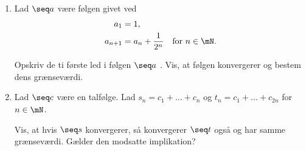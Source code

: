 \begin{opg}\hfill 
\begin{enumerate}
    \item Lad $\seq a$ være følgen givet ved
    \begin{align*}
    a_1 &= 1, \\
    a_{n+1} &= a_n+\frac{1}{2^n} \quad \text{for $n \in \mN$}. 
    \end{align*}
  
    Opskriv de ti første led i følgen $\seq a$ . Vis, at følgen konvergerer og bestem dens grænseværdi. 
%  
  
    \item Lad $\seq c$ være en talfølge. Lad $s_n = c_1 + \dots + c_n$ og $t_n = c_1 + \dots + c_{2n}$ for $n \in \mN$.
  
    Vis, at hvis $\seq s$ konvergerer, så konvergerer $\seq t$ også og har samme grænseværdi. Gælder den modsatte implikation?
\end{enumerate}
\end{opg}



